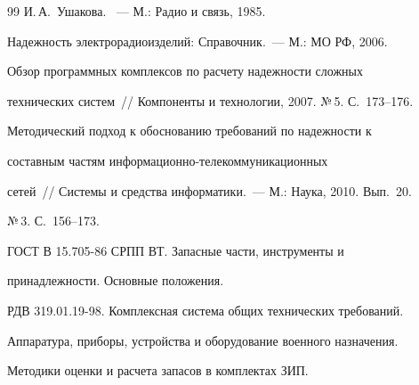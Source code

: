 {{\begin{thebibliography}{99}
И.\,А.~Ушакова. ~--- М.: Радио и связь, 1985.







     Надежность электрорадиоизделий: Справочник.~--- М.: МО РФ, 2006.









     Обзор программных комплексов по расчету надежности сложных 


технических систем~/\!\!/ Компоненты и технологии, 2007. №\,5. С.~173--176.





    









     Методический подход к обосно\-ва\-нию требований по надежности к 


составным частям ин\-фор\-ма\-ци\-он\-но-те\-ле\-ком\-му\-ни\-ка\-ци\-он\-ных 


сетей~/\!\!/ Системы и средства информатики.~--- М.: Наука, 2010. Вып.~20. 


№\,3. С.~156--173.




     ГОСТ В 15.705-86 СРПП ВТ. Запасные части, инструменты и 


принадлежности. Основные положения.





       







     РДВ 319.01.19-98. Комплексная система общих технических требований. 


Аппаратура, приборы, устройства и оборудование военного назначения. 


Методики оценки и расчета запасов в комплектах ЗИП.











\end{thebibliography}}}
